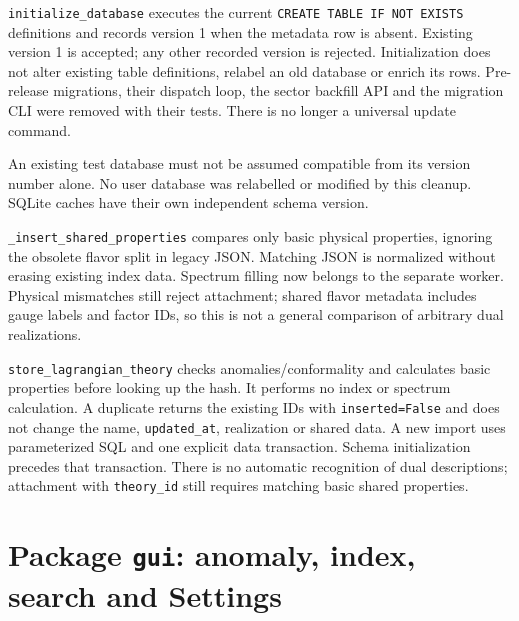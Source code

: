 \documentclass[11pt,a4paper]{article}
\numberwithin{equation}{section}
\newcommand{\code}[1]{{\small\nolinkurl{#1}}}
\begin{document}
\code{initialize_database} executes the current
\code{CREATE TABLE IF NOT EXISTS} definitions and records version 1 when the
metadata row is absent. Existing version 1 is accepted; any other recorded
version is rejected. Initialization does not alter existing table definitions,
relabel an old database or enrich its rows. Pre-release migrations, their
dispatch loop, the sector backfill API and the migration CLI were removed
with their tests. There is no longer a universal update command.

An existing test database must not be assumed compatible from its version
number alone. No user database was relabelled or modified by this cleanup.
SQLite caches have their own independent schema version.

\code{_insert_shared_properties} compares only basic physical properties,
ignoring the obsolete flavor split in legacy JSON. Matching JSON is normalized
without erasing existing index data. Spectrum filling now belongs to the
separate worker. Physical mismatches still reject attachment; shared flavor
metadata includes gauge labels and factor IDs, so this is not a general
comparison of arbitrary dual realizations.

\code{store_lagrangian_theory} checks anomalies/conformality and calculates
basic properties before looking up the hash. It performs no index or spectrum
calculation. A duplicate returns the existing IDs with \code{inserted=False}
and does not change the name, \code{updated_at}, realization or shared data.
A new import uses parameterized SQL and one explicit data transaction.
Schema initialization precedes that transaction. There is no automatic
recognition of dual descriptions; attachment with \code{theory_id} still
requires matching basic shared properties.

\clearpage


\clearpage
\section{Package \texttt{gui}: anomaly, index, search and Settings}\label{sec:gui}




\clearpage
\end{document}
